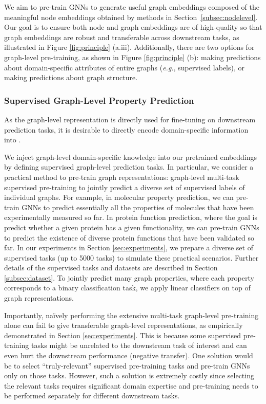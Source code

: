\documentclass{article} \usepackage{iclr2020_conference,times}
\numberwithin{equation}{section}
\theoremstyle{plain}
\theoremstyle{definition}
\theoremstyle{remark}
\newcommand{\eg}{\textit{e.g.}}
\begin{document}
We aim to pre-train GNNs to generate useful graph embeddings composed of the meaningful node embeddings obtained by methods in Section~\ref{subsec:nodelevel}. Our goal is to ensure both node and graph embeddings are of high-quality so that graph embeddings are robust and transferable across downstream tasks, as illustrated in Figure \ref{fig:principle} (a.iii). Additionally, there are two options for graph-level pre-training, as shown in Figure \ref{fig:principle} (b): making predictions about domain-specific attributes of entire graphs (\eg, supervised labels), or making predictions about graph structure.

\subsubsection{Supervised Graph-Level Property Prediction}

As the graph-level representation  is directly used for fine-tuning on downstream prediction tasks, it is desirable to directly encode domain-specific information into . 

We inject graph-level domain-specific knowledge into our pretrained embeddings by defining supervised graph-level prediction tasks. 
In particular, we consider a practical method to pre-train graph representations: graph-level multi-task supervised pre-training to jointly predict a diverse set of supervised labels of individual graphs.
For example, in molecular property prediction, we can pre-train GNNs to predict essentially all the properties of molecules that have been experimentally measured so far. In protein function prediction, where the goal is predict whether a given protein has a given functionality, we can pre-train GNNs to predict the existence of diverse protein functions that have been validated so far. In our experiments in Section \ref{sec:experiments}, we prepare a diverse set of supervised tasks (up to 5000 tasks) to simulate these practical scenarios. Further details of the supervised tasks and datasets are described in Section \ref{subsec:dataset}.
To jointly predict many graph properties, where each property corresponds to a binary classification task, we apply linear classifiers on top of graph representations.

Importantly, na\"ively performing the extensive multi-task graph-level pre-training alone can fail to give transferable graph-level representations, as empirically demonstrated in Section \ref{sec:experiments}.
This is because some supervised pre-training tasks might be unrelated to the downstream task of interest and can even hurt the downstream performance (negative transfer). 
One solution would be to select ``truly-relevant'' supervised pre-training tasks and pre-train GNNs only on those tasks. However, such a solution is extremely costly since selecting the relevant tasks requires significant domain expertise and pre-training needs to be performed separately for different downstream tasks. 
\end{document}

